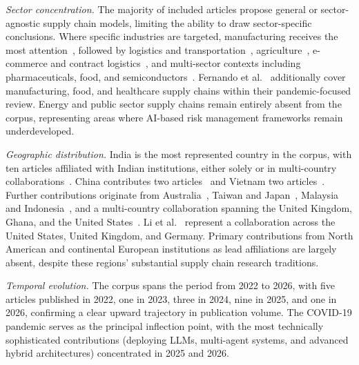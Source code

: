 \textit{Sector concentration.} The majority of included articles propose general or sector-agnostic supply chain models, limiting the ability to draw sector-specific conclusions. Where specific industries are targeted, manufacturing receives the most attention~\cite{yang2025design,li2025endtoend}, followed by logistics and transportation~\cite{le2025crisis,rajesh2025smartops}, agriculture~\cite{nayal2022exploring}, e-commerce and contract logistics~\cite{adom2025design}, and multi-sector contexts including pharmaceuticals, food, and semiconductors~\cite{lin2025generative}. Fernando et al.~\cite{fernando2024covid} additionally cover manufacturing, food, and healthcare supply chains within their pandemic-focused review. Energy and public sector supply chains remain entirely absent from the corpus, representing areas where AI-based risk management frameworks remain underdeveloped.

\textit{Geographic distribution.} India is the most represented country in the corpus, with ten articles affiliated with Indian institutions, either solely or in multi-country collaborations~\cite{renuga2026ai,aldehayyat2025applying,deivaganesh2022future,deivaganesh2022supply,farzhana2025hybrid,gupta2025supplier,kumar2023enhancing,nayal2022exploring,naz2022artificial,rajesh2025smartops}. China contributes two articles~\cite{yang2024building,yang2025design} and Vietnam two articles~\cite{le2025crisis,nguyen2024federated}. Further contributions originate from Australia~\cite{nimmy2022explainability}, Taiwan and Japan~\cite{lin2025generative}, Malaysia and Indonesia~\cite{fernando2024covid}, and a multi-country collaboration spanning the United Kingdom, Ghana, and the United States~\cite{adom2025design}. Li et al.~\cite{li2025endtoend} represent a collaboration across the United States, United Kingdom, and Germany. Primary contributions from North American and continental European institutions as lead affiliations are largely absent, despite these regions' substantial supply chain research traditions.

\textit{Temporal evolution.} The corpus spans the period from 2022 to 2026, with five articles published in 2022, one in 2023, three in 2024, nine in 2025, and one in 2026, confirming a clear upward trajectory in publication volume. The COVID-19 pandemic serves as the principal inflection point, with the most technically sophisticated contributions (deploying LLMs, multi-agent systems, and advanced hybrid architectures) concentrated in 2025 and 2026.